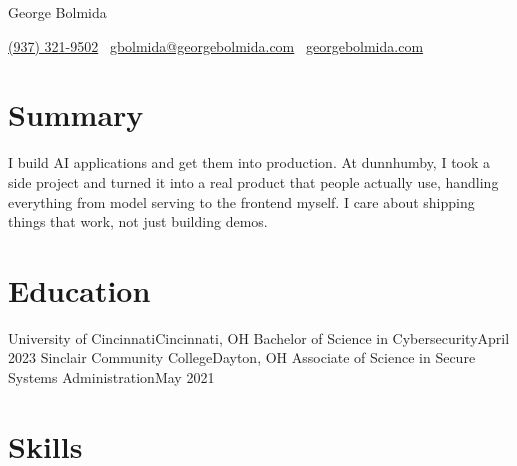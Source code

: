\documentclass{resumestyle}
\begin{document}
\resumeHeader
  {George Bolmida}

\contactInfo
  {\href{tel:+19373219502}{(937) 321-9502} \textbullet \ \href{mailto:gbolmida@georgebolmida.com}{gbolmida@georgebolmida.com} \textbullet \ \href{https://georgebolmida.com}{georgebolmida.com}}

\section{Summary}
  \resumeSubHeadingListStart
    \item[] I build AI applications and get them into production. At dunnhumby, I took a side project and turned it into a real product that people actually use, handling everything from model serving to the frontend myself. I care about shipping things that work, not just building demos.
  \resumeSubHeadingListEnd

\section{Education}
  \resumeSubHeadingListStart
    \resumeSubheading
      {University of Cincinnati}{Cincinnati, OH}
      {Bachelor of Science in Cybersecurity}{April 2023}
    \resumeSubheading
      {Sinclair Community College}{Dayton, OH}
      {Associate of Science in Secure Systems Administration}{May 2021}
  \resumeSubHeadingListEnd

\section{Skills}
  \resumeSubHeadingListStart
  \resumeSubHeadingListEnd

\end{document}
